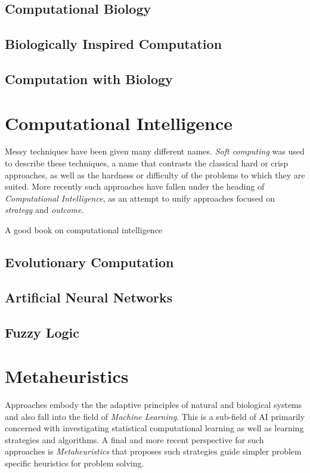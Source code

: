 \documentclass[a4paper, 11pt]{article}
\begin{document}
\subsection{Computational Biology}

\subsection{Biologically Inspired Computation}

\subsection{Computation with Biology}


% 
% 
\section{Computational Intelligence}
\label{sec:computationl_intelligence}
Messy techniques have been given many different names. \emph{Soft computing} was used to describe these techniques, a name that contrasts the classical hard or crisp approaches, as well as the hardness or difficulty of the problems to which they are suited. More recently such approaches have fallen under the heading of \emph{Computational Intelligence}, as an attempt to unify approaches focused on \emph{strategy} and \emph{outcome}.

A good book on computational intelligence \cite{Engelbrecht2007}

\subsection{Evolutionary Computation}

\subsection{Artificial Neural Networks}

\subsection{Fuzzy Logic}

% 
% 
\section{Metaheuristics}
\label{sec:metaheuristics}
Approaches embody the the adaptive principles of natural and biological systems and also fall into the field of \emph{Machine Learning}. This is a sub-field of AI primarily concerned with investigating statistical computational learning as well as learning strategies and algorithms. A final and more recent perspective for such approaches is \emph{Metaheuristics} that proposes such strategies guide simpler problem specific heuristics for problem solving.
\end{document}
